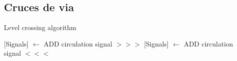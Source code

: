 \subsection{Cruces de via}

\lipsum[1]

        \begin{algorithm}[hbt!]
        \caption{Level crossing algorithm}\label{alg:LC}
        \DontPrintSemicolon
        \SetNoFillComment
        \LinesNotNumbered 
        {
            [Signals] $\gets$ ADD circulation signal $>>>$\;
            [Signals] $\gets$ ADD circulation signal $<<<$\;
        }
        \KwResult{[Signals]} 
    \end{algorithm}